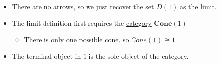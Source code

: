 \begin{itemize}
    \item  There are no arrows, so we just recover the set $D(1)$ as the limit.
    \item The limit definition first requires the \hyperref[D3.92]{category} $\mathbf{Cone}(1)$
          \begin{itemize}
            \item There is only one possible cone, so $Cone(1)\cong 1$
          \end{itemize}
    \item The terminal object in $1$ is the sole object of the category.
  \end{itemize}
